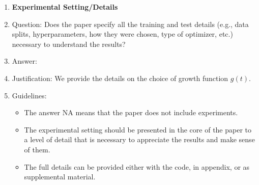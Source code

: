 \documentclass{article}
\theoremstyle{plain}
\theoremstyle{definition}
\theoremstyle{remark}
\theoremstyle{plain}
\begin{document}
\begin{enumerate}
\item {\bf Experimental Setting/Details}
    \item[] Question: Does the paper specify all the training and test details (e.g., data splits, hyperparameters, how they were chosen, type of optimizer, etc.) necessary to understand the results?
    \item[] Answer: \answerYes{} %
    \item[] Justification: We provide the details on the choice of growth function $g(t)$.
    \item[] Guidelines:
    \begin{itemize}
        \item The answer NA means that the paper does not include experiments.
        \item The experimental setting should be presented in the core of the paper to a level of detail that is necessary to appreciate the results and make sense of them.
        \item The full details can be provided either with the code, in appendix, or as supplemental material.
    \end{itemize}


\end{enumerate}
\end{document}
